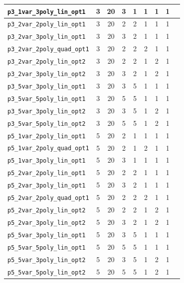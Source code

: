 \begin{table}[H]
{\begin{tabular}{lcccccccc}
\hline
\texttt{p3\_1var\_3poly\_lin\_opt1} & 3 & 20 & 3 & 1 & 1 & 1 & 1 \\
\hline
\texttt{p3\_2var\_2poly\_lin\_opt1} & 3 & 20 & 2 & 2 & 1 & 1 & 1 \\
\hline
\texttt{p3\_2var\_3poly\_lin\_opt1} & 3 & 20 & 3 & 2 & 1 & 1 & 1 \\
\hline
\texttt{p3\_2var\_2poly\_quad\_opt1} & 3 & 20 & 2 & 2 & 2 & 1 & 1 \\
\hline
\texttt{p3\_2var\_2poly\_lin\_opt2} & 3 & 20 & 2 & 2 & 1 & 2 & 1 \\
\hline
\texttt{p3\_2var\_3poly\_lin\_opt2} & 3 & 20 & 3 & 2 & 1 & 2 & 1 \\
\hline
\texttt{p3\_5var\_3poly\_lin\_opt1} & 3 & 20 & 3 & 5 & 1 & 1 & 1 \\
\hline
\texttt{p3\_5var\_5poly\_lin\_opt1} & 3 & 20 & 5 & 5 & 1 & 1 & 1 \\
\hline
\texttt{p3\_5var\_3poly\_lin\_opt2} & 3 & 20 & 3 & 5 & 1 & 2 & 1 \\
\hline
\texttt{p3\_5var\_5poly\_lin\_opt2} & 3 & 20 & 5 & 5 & 1 & 2 & 1 \\
\hline
\texttt{p5\_1var\_2poly\_lin\_opt1} & 5 & 20 & 2 & 1 & 1 & 1 & 1 \\
\hline
\texttt{p5\_1var\_2poly\_quad\_opt1} & 5 & 20 & 2 & 1 & 2 & 1 & 1 \\
\hline
\texttt{p5\_1var\_3poly\_lin\_opt1} & 5 & 20 & 3 & 1 & 1 & 1 & 1 \\
\hline
\texttt{p5\_2var\_2poly\_lin\_opt1} & 5 & 20 & 2 & 2 & 1 & 1 & 1 \\
\hline
\texttt{p5\_2var\_3poly\_lin\_opt1} & 5 & 20 & 3 & 2 & 1 & 1 & 1 \\
\hline
\texttt{p5\_2var\_2poly\_quad\_opt1} & 5 & 20 & 2 & 2 & 2 & 1 & 1 \\
\hline
\texttt{p5\_2var\_2poly\_lin\_opt2} & 5 & 20 & 2 & 2 & 1 & 2 & 1 \\
\hline
\texttt{p5\_2var\_3poly\_lin\_opt2} & 5 & 20 & 3 & 2 & 1 & 2 & 1 \\
\hline
\texttt{p5\_5var\_3poly\_lin\_opt1} & 5 & 20 & 3 & 5 & 1 & 1 & 1 \\
\hline
\texttt{p5\_5var\_5poly\_lin\_opt1} & 5 & 20 & 5 & 5 & 1 & 1 & 1 \\
\hline
\texttt{p5\_5var\_3poly\_lin\_opt2} & 5 & 20 & 3 & 5 & 1 & 2 & 1 \\
\hline
\texttt{p5\_5var\_5poly\_lin\_opt2} & 5 & 20 & 5 & 5 & 1 & 2 & 1 \\
\bottomrule
\end{tabular}
}%
\end{table}

